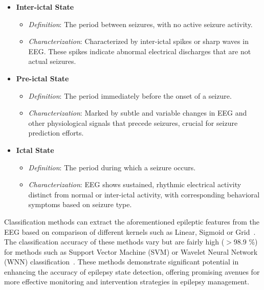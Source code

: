 \begin{itemize}
    \item \textbf{Inter-ictal State}
          \begin{itemize}
              \item \textit{Definition}: The period between seizures, with no active seizure activity.
              \item \textit{Characterization}: Characterized by inter-ictal spikes or sharp waves in EEG\@.
                    These spikes indicate abnormal electrical discharges that are not actual seizures.
          \end{itemize}
    \item \textbf{Pre-ictal State}
          \begin{itemize}
              \item \textit{Definition}: The period immediately before the onset of a seizure.
              \item \textit{Characterization}: Marked by subtle and variable changes in EEG and other physiological signals that precede seizures,
                    crucial for seizure prediction efforts.
          \end{itemize}
    \item \textbf{Ictal State}
          \begin{itemize}
              \item \textit{Definition}: The period during which a seizure occurs.
              \item \textit{Characterization}: EEG shows sustained, rhythmic electrical activity distinct from normal or inter-ictal activity,
                    with corresponding behavioral symptoms based on seizure type.
          \end{itemize}
\end{itemize}

\noindent Classification methods can extract the aforementioned epileptic features from the EEG based on comparison of
different kernels such as Linear, Sigmoid or Grid~\parencite{liFeatureExtractionRecognition2013}. The classification accuracy of these methods vary but are fairly high (\(>\)98.9 \%) for methods such as
Support Vector Machine (SVM) or Wavelet Neural Network (WNN) classification~\parencite{yayikEpilepticStateDetection2015}.
These methods demonstrate significant potential in enhancing the accuracy of epilepsy state detection, offering promising avenues for more
effective monitoring and intervention strategies in epilepsy management.

